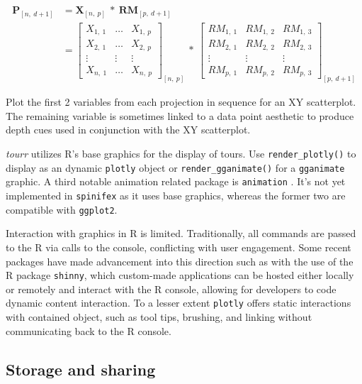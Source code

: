 \documentclass{monashthesis}
\begin{document}
\begin{align}
  \textbf{P}_{[n,~d+1]}
    &= \textbf{X}_{[n,~p]} ~*~ \textbf{RM}_{[p,~d+1]} \\
    &=
      \begin{bmatrix}
          X_{1,~1} & \dots & X_{1,~p} \\
          X_{2,~1} & \dots & X_{2,~p} \\
          \vdots   & \vdots & \vdots  \\
          X_{n,~1} & \dots & X_{n,~p}
      \end{bmatrix}_{[n,~p]}
      ~*~
      \begin{bmatrix}
        RM_{1,~1} & RM_{1,~2} & RM_{1,~3} \\
        RM_{2,~1} & RM_{2,~2} & RM_{2,~3} \\
        \vdots     & \vdots     & \vdots     \\
        RM_{p,~1} & RM_{p,~2} & RM_{p,~3}
      \end{bmatrix}_{[p,~d+1]}
\end{align}

Plot the first 2 variables from each projection in sequence for an XY
scatterplot. The remaining variable is sometimes linked to a data point
aesthetic to produce depth cues used in conjunction with the XY
scatterplot.

\emph{tourr} utilizes R's base graphics for the display of tours. Use
\texttt{render\_plotly()} to display as an dynamic \texttt{plotly}
\textcite{sievert_plotly_2018} object or \texttt{render\_gganimate()}
for a \texttt{gganimate} \textcite{pedersen_gganimate:_2019} graphic. A
third notable animation related package is \texttt{animation}
\textcite{xie_animation:_2018}. It's not yet implemented in
\texttt{spinifex} as it uses base graphics, whereas the former two are
compatible with \texttt{ggplot2}.

Interaction with graphics in R is limited. Traditionally, all commands
are passed to the R via calls to the console, conflicting with user
engagement. Some recent packages have made advancement into this
direction such as with the use of the R package \texttt{shinny}, which
custom-made applications can be hosted either locally or remotely and
interact with the R console, allowing for developers to code dynamic
content interaction. To a lesser extent \texttt{plotly} offers static
interactions with contained object, such as tool tips, brushing, and
linking without communicating back to the R console.

\subsection{Storage and sharing}\label{storage-and-sharing-1}
\end{document}

